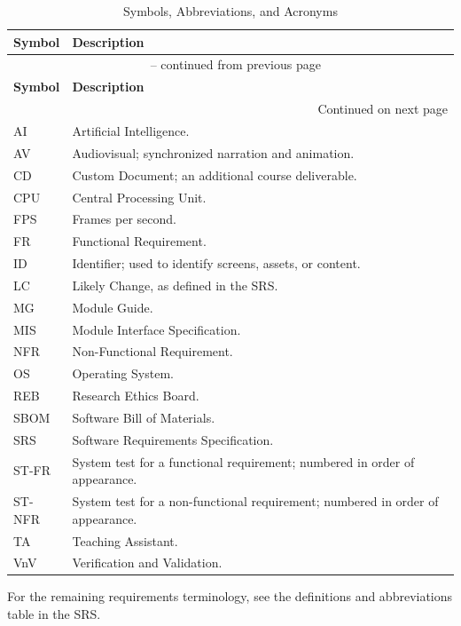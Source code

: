 \documentclass[10pt,titlepage]{article}
\begin{document}
\renewcommand{\arraystretch}{1.2}
\begin{longtable}{@{}p{}p{}@{}}
\caption{Symbols, Abbreviations, and Acronyms}\label{tab:VnVAcronyms}\\
\toprule
\textbf{Symbol} & \textbf{Description}\\
\midrule
\endfirsthead
\multicolumn{2}{c}{\tablename\ \thetable{} -- continued from previous page}\\
\toprule
\textbf{Symbol} & \textbf{Description}\\
\midrule
\endhead
\midrule
\multicolumn{2}{r}{Continued on next page}\\
\endfoot
\bottomrule
\endlastfoot
AI & Artificial Intelligence.\\
AV & Audiovisual; synchronized narration and animation.\\
CD & Custom Document; an additional course deliverable.\\
CPU & Central Processing Unit.\\
FPS & Frames per second.\\
FR & Functional Requirement.\\
ID & Identifier; used to identify screens, assets, or content.\\
LC & Likely Change, as defined in the SRS.\\
MG & Module Guide.\\
MIS & Module Interface Specification.\\
NFR & Non-Functional Requirement.\\
OS & Operating System.\\
REB & Research Ethics Board.\\
SBOM & Software Bill of Materials.\\
SRS & Software Requirements Specification.\\
ST-FR & System test for a functional requirement; numbered in order of appearance.\\
ST-NFR & System test for a non-functional requirement; numbered in order of appearance.\\
TA & Teaching Assistant.\\
VnV & Verification and Validation.\\
\end{longtable}

For the remaining requirements terminology, see the definitions and
abbreviations table in the SRS.

\newpage

\end{document}
